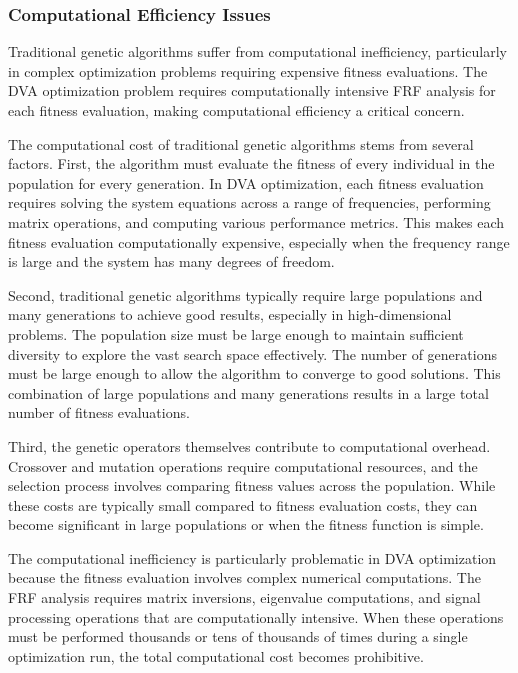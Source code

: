 \documentclass[12pt,a4paper]{article}
\begin{document}
\subsubsection{Computational Efficiency Issues}

Traditional genetic algorithms suffer from computational inefficiency, particularly in complex optimization problems requiring expensive fitness evaluations. The DVA optimization problem requires computationally intensive FRF analysis for each fitness evaluation, making computational efficiency a critical concern.

The computational cost of traditional genetic algorithms stems from several factors. First, the algorithm must evaluate the fitness of every individual in the population for every generation. In DVA optimization, each fitness evaluation requires solving the system equations across a range of frequencies, performing matrix operations, and computing various performance metrics. This makes each fitness evaluation computationally expensive, especially when the frequency range is large and the system has many degrees of freedom.

Second, traditional genetic algorithms typically require large populations and many generations to achieve good results, especially in high-dimensional problems. The population size must be large enough to maintain sufficient diversity to explore the vast search space effectively. The number of generations must be large enough to allow the algorithm to converge to good solutions. This combination of large populations and many generations results in a large total number of fitness evaluations.

Third, the genetic operators themselves contribute to computational overhead. Crossover and mutation operations require computational resources, and the selection process involves comparing fitness values across the population. While these costs are typically small compared to fitness evaluation costs, they can become significant in large populations or when the fitness function is simple.

The computational inefficiency is particularly problematic in DVA optimization because the fitness evaluation involves complex numerical computations. The FRF analysis requires matrix inversions, eigenvalue computations, and signal processing operations that are computationally intensive. When these operations must be performed thousands or tens of thousands of times during a single optimization run, the total computational cost becomes prohibitive.
\end{document}
